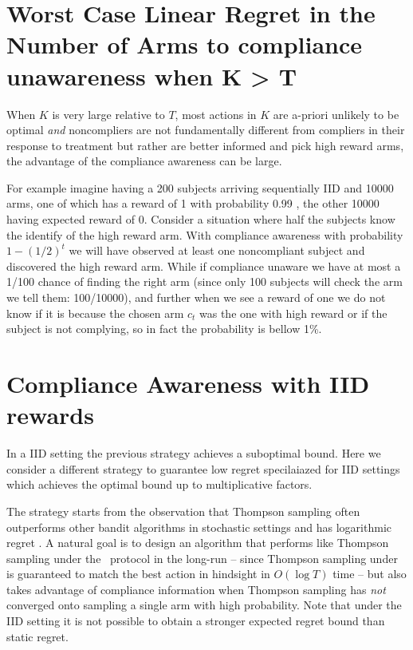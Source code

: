 


\section{Worst Case Linear Regret in the Number of Arms to compliance unawareness when K > T}

When $K$ is very large relative to $T$, most actions in $K$ are a-priori unlikely to be optimal \emph{and} noncompliers are not fundamentally different from compliers in their response to treatment but rather are better informed and pick high reward arms,  the advantage of the compliance awareness can be large.

For example imagine having a 200 subjects arriving sequentially IID and 10000 arms, one of which has a reward of 1 with probability 0.99 , the other 10000 having expected reward of 0.
Consider a situation where half the subjects know the identify of the high reward arm.
With compliance awareness with probability $1-(1/2)^t$ we will have observed at least one noncompliant subject and discovered the high reward arm.
While if compliance unaware we have at most a 1/100 chance of finding the right arm (since only 100 subjects will check the arm we tell them:  100/10000), and further when we see a reward of one we do not know if it is because the chosen arm $c_t$ was the one with high reward or if the subject is not complying, so in fact the probability is bellow 1\%.



\section{Compliance Awareness with IID rewards}


In a IID setting the previous strategy achieves a suboptimal bound.
 Here we consider a different strategy to guarantee low regret specilaiazed for IID settings which achieves the optimal bound up to multiplicative factors. 



The strategy starts from the observation that Thompson sampling often outperforms other bandit algorithms in stochastic settings \cite{thompson:33, chapelle:11} and has logarithmic regret \cite{agrawal:12, kaufmann:12}. A natural goal is to design an algorithm that performs like Thompson sampling under the \chosen\, protocol in the long-run -- since Thompson sampling under \chosen\, is guaranteed to match the best action in hindsight in $O(\log T)$ time -- but also takes advantage of compliance information when Thompson sampling has \emph{not} converged onto sampling a single arm with high probability. Note that under the IID setting it is not possible to obtain a stronger expected regret bound than static regret. 

